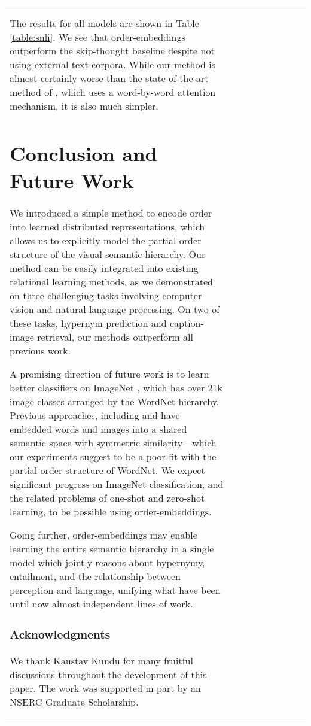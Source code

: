 \documentclass{article} \usepackage{iclr2016_conference,times}
\begin{document}
\begin{table*}[t]
\begin{tabulary}{\linewidth}{L|CCCC|CCCC}
The results for all models are shown in Table \ref{table:snli}. We see that order-embeddings outperform the skip-thought baseline despite not using external text corpora. While our method is almost certainly worse than the state-of-the-art method of \citet{rocktaschel2015reasoning}, which uses a word-by-word attention mechanism, it is also much simpler. 
\vspace{-1mm}
\section{Conclusion and Future Work}
\vspace{-0.5mm}

We introduced a simple method to encode order into learned distributed representations, which allows us to explicitly model the partial order structure of the visual-semantic hierarchy. Our method can be easily integrated into existing relational learning methods, as we demonstrated  on three challenging tasks involving computer vision and natural language processing. On two of these tasks, hypernym prediction and caption-image retrieval, our methods outperform all previous work.

A promising direction of future work is to learn better classifiers on ImageNet \citep{imagenet}, which has over 21k image classes arranged by the WordNet hierarchy.  Previous approaches, including \citet{frome2013devise} and \citet{norouzi2013zero} have embedded words and images into a shared semantic space with symmetric similarity---which our experiments suggest to be a poor fit with the partial order structure of WordNet. We expect significant progress on ImageNet classification, and the related problems of one-shot and zero-shot learning,  to be possible using order-embeddings.

Going further, order-embeddings may enable learning the entire semantic hierarchy in a single model which jointly reasons about hypernymy, entailment, and the relationship between perception and language, unifying what have been until now almost independent lines of work. 


\subsubsection*{Acknowledgments}
We thank Kaustav Kundu for many fruitful discussions throughout the development of this paper. The work was supported in part by an NSERC Graduate Scholarship. 





\end{tabulary}
\end{table*}
\end{document}
